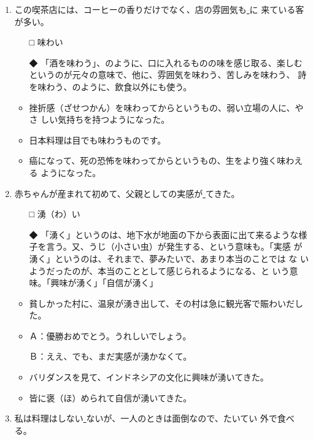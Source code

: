 \documentclass[
uplatex,
b5paper,
10pt,
dvipdfmx
]{jsbook}
\begin{document}
\begin{enumerate}
\item この喫茶店には、コーヒーの香りだけでなく、店の雰囲気も\underline{   }に
      来ている客が多い。
\begin{itemize}
\item[□] 味わい
\item[◆] 「酒を味わう」、のように、口に入れるものの味を感じ取る、楽しむ
	  というのが元々の意味で、他に、雰囲気を味わう、苦しみを味わう、
	  詩を味わう、のように、飲食以外にも使う。
\end{itemize}
\begin{itemize}
\item 挫折感（ざせつかん）を味わってからというもの、弱い立場の人に、やさ
      しい気持ちを持つようになった。
\item 日本料理は目でも味わうものです。
\item 癌になって、死の恐怖を味わってからというもの、生をより強く味わえる
      ようになった。
\end{itemize}

\item 赤ちゃんが産まれて初めて、父親としての実感が\underline{   }てきた。
\begin{itemize}
\item[□] 湧（わ）い
\item[◆] 「湧く」というのは、地下水が地面の下から表面に出て来るような様
	  子を言う。又、うじ（小さい虫）が発生する、という意味も。「実感
	  が湧く」というのは、それまで、夢みたいで、あまり本当のことでは
	  な いようだったのが、本当のこととして感じられるようになる、と
	  いう意味。「興味が湧く」「自信が湧く」
\end{itemize}
\begin{itemize}
\item 貧しかった村に、温泉が湧き出して、その村は急に観光客で賑わいだした。
\item Ａ：優勝おめでとう。うれしいでしょう。

      Ｂ：ええ、でも、まだ実感が湧かなくて。  

\item バリダンスを見て、インドネシアの文化に興味が湧いてきた。
\item 皆に褒（ほ）められて自信が湧いてきた。
\end{itemize}

\item 私は料理はしない\underline{   }ないが、一人のときは面倒なので、たいてい
      外で食べる。


\end{enumerate}
\end{document}
